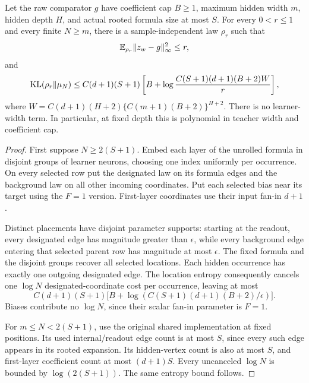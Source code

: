 \begin{lemma}
\label{lem:VG-raw-comparison}
Let the raw comparator $g$ have coefficient cap $B\ge1$, maximum hidden width $m$, hidden depth $H$, and actual rooted formula size at most $S$. For every $0<r\le1$ and every finite $N\ge m$, there is a sample-independent law $\rho_r$ such that
\[
 \mathbb E_{\rho_r}\|z_w-g\|_\infty^2\le r,
\]
and
\begin{equation}
 \operatorname{KL}(\rho_r\|\mu_N)
 \le C(d+1)(S+1)\left[
 B+\log\frac{C(S+1)(d+1)(B+2)W}{r}\right],
 \label{eq:VG-raw-comparison}
\end{equation}
where $W=C(d+1)(H+2)\{C(m+1)(B+2)\}^{H+2}$.
There is no learner-width term. In particular, at fixed depth this is polynomial in teacher width and coefficient cap.
\end{lemma}
\begin{proof}
First suppose $N\ge2(S+1)$. Embed each layer of the unrolled formula in disjoint groups of learner neurons, choosing one index uniformly per occurrence. On every selected row put the designated law on its formula edges and the background law on all other incoming coordinates. Put each selected bias near its target using the $F=1$ version. First-layer coordinates use their input fan-in $d+1$.

Distinct placements have disjoint parameter supports: starting at the readout, every designated edge has magnitude greater than $\epsilon$, while every background edge entering that selected parent row has magnitude at most $\epsilon$. The fixed formula and the disjoint groups recover all selected locations. Each hidden occurrence has exactly one outgoing designated edge. The location entropy consequently cancels one $\log N$ designated-coordinate cost per occurrence, leaving at most
\[
 C(d+1)(S+1)\big[B+\log(C(S+1)(d+1)(B+2)/\epsilon)\big].
\]
Biases contribute no $\log N$, since their scalar fan-in parameter is $F=1$.

For $m\le N<2(S+1)$, use the original shared implementation at fixed positions. Its used internal/readout edge count is at most $S$, since every such edge appears in its rooted expansion. Its hidden-vertex count is also at most $S$, and first-layer coefficient count at most $(d+1)S$. Every uncanceled $\log N$ is bounded by $\log(2(S+1))$. The same entropy bound follows.


\end{proof}
